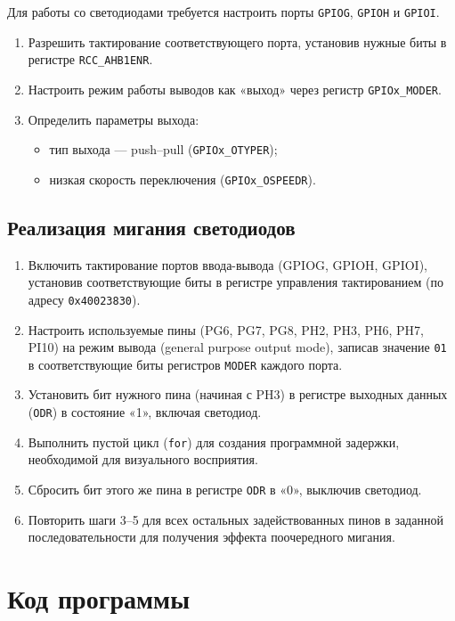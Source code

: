 Для работы со светодиодами требуется настроить порты \texttt{GPIOG}, \texttt{GPIOH} и \texttt{GPIOI}.

\begin{enumerate}
  \item Разрешить тактирование соответствующего порта, установив нужные биты в регистре \texttt{RCC\_AHB1ENR}.
  \item Настроить режим работы выводов как «выход» через регистр \texttt{GPIOx\_MODER}.
  \item Определить параметры выхода:
  \begin{itemize}
      \item тип выхода — push--pull (\texttt{GPIOx\_OTYPER});
      \item низкая скорость переключения (\texttt{GPIOx\_OSPEEDR}).
  \end{itemize}
\end{enumerate}

\subsection{Реализация мигания светодиодов}

\begin{enumerate}
  \item Включить тактирование портов ввода-вывода (GPIOG, GPIOH, GPIOI), установив соответствующие биты в регистре управления тактированием (по адресу \texttt{0x40023830}).
  \item Настроить используемые пины (PG6, PG7, PG8, PH2, PH3, PH6, PH7, PI10) на режим вывода (general purpose output mode), записав значение \texttt{01} в соответствующие биты регистров \texttt{MODER} каждого порта.
  \item Установить бит нужного пина (начиная с PH3) в регистре выходных данных (\texttt{ODR}) в состояние «1», включая светодиод.
  \item Выполнить пустой цикл (\texttt{for}) для создания программной задержки, необходимой для визуального восприятия.
  \item Сбросить бит этого же пина в регистре \texttt{ODR} в «0», выключив светодиод.
  \item Повторить шаги 3--5 для всех остальных задействованных пинов в заданной последовательности для получения эффекта поочередного мигания.
\end{enumerate}


\newpage

\section*{Код программы}

